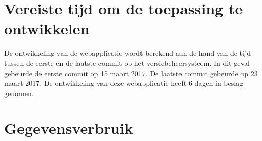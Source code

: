 \section{Vereiste tijd om de toepassing te ontwikkelen}
De ontwikkeling van de webapplicatie wordt berekend aan de hand van de tijd tussen de eerste en de laatste commit op het
versiebeheersysteem. In dit geval gebeurde de eerste commit op 15 maart 2017. De laatste commit gebeurde op 23 maart 2017.
De ontwikkeling van deze webapplicatie heeft 6 dagen in beslag genomen.

\section{Gegevensverbruik}

\section{}
